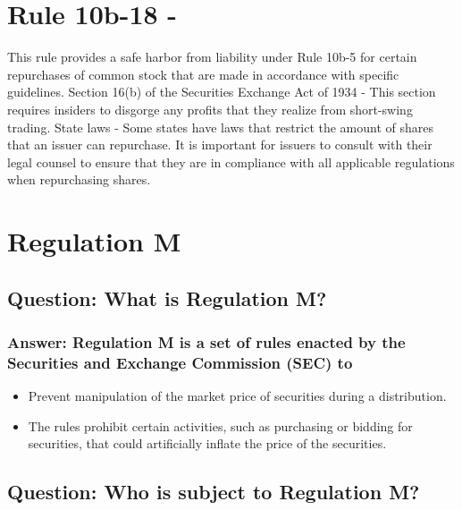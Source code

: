 \documentclass[11pt]{article}
\begin{document}
\section{Rule 10b-18 -}
\label{sec:org95bdb57}
This rule provides a safe harbor from liability under Rule 10b-5 for certain repurchases of common stock that are made in accordance with specific guidelines.
Section 16(b) of the Securities Exchange Act of 1934 - This section requires insiders to disgorge any profits that they realize from short-swing trading.
State laws - Some states have laws that restrict the amount of shares that an issuer can repurchase.
It is important for issuers to consult with their legal counsel to ensure that they are in compliance with all applicable regulations when repurchasing shares.

\section{Regulation M}
\label{sec:org3bf8200}

\subsection{Question: What is Regulation M?}
\label{sec:orgf8fcde8}

\subsubsection{Answer: Regulation M is a set of rules enacted by the Securities and Exchange Commission (SEC) to}
\label{sec:orgcbf0575}
\begin{itemize}
\item Prevent manipulation of the market price of securities during a distribution.
\item The rules prohibit certain activities, such as purchasing or bidding for securities, that could artificially inflate the price of the securities.
\end{itemize}

\subsection{Question: Who is subject to Regulation M?}
\label{sec:orgeffd764}
\end{document}
